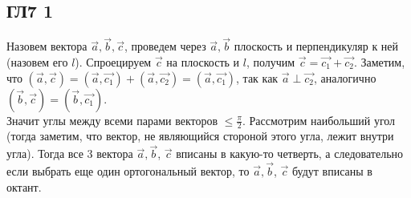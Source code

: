 \subsection*{ГЛ7 1}
Назовем вектора $\vec{a}, \vec{b}, \vec{c}$, проведем через $\vec{a}, \vec{b}$ плоскость и перпендикуляр к ней (назовем его $l$). Спроецируем $\vec{c}$ на плоскость и $l$, получим $\vec{c} = \vec{c_1} + \vec{c_2}$. Заметим, что $(\vec{a}, \vec{c}) = (\vec{a}, \vec{c_1}) + (\vec{a}, \vec{c_2}) = (\vec{a}, \vec{c_1})$, так как $\vec{a} \perp \vec{c_2}$, аналогично $(\vec{b}, \vec{c}) = (\vec{b}, \vec{c_1})$.\\
Значит углы между всеми парами векторов $\leqslant \frac{\pi}{2}$. Рассмотрим наибольший угол (тогда заметим, что вектор, не являющийся стороной этого угла, лежит внутри угла). Тогда все 3 вектора $\vec{a}, \vec{b}$, $\vec{c}$ вписаны в какую-то четверть, а следовательно если выбрать еще один ортогональный вектор, то $\vec{a}, \vec{b}$, $\vec{c}$ будут вписаны в октант.